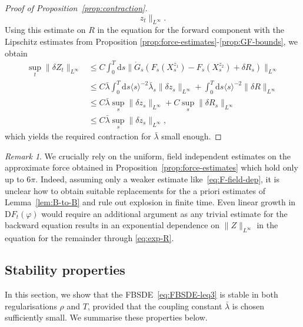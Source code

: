 \documentclass[11pt, a4paper]{scrartcl}
\numberwithin{equation}{section}
\theoremstyle{plain}
\theoremstyle{remark}
\newtheorem{remark}[foo]{Remark}
\newcommand{\mathD}{\mathrm{D}}
\newcommand{\mathd}{\mathrm{d}}
\begin{document}
\begin{proof}[Proof of Proposition~\ref{prop:contraction}]
\[     z_t \|_{L^{\infty}} . \]
  Using this estimate on $R$ in the equation for the forward component with
  the Lipschitz estimates from Proposition
  \ref{prop:force-estimates}-\ref{prop:GF-bounds}, we obtain
  \[ \begin{aligned}
       \sup_t \| \delta Z_t \|_{L^{\infty}} &\leqslant  C \int_0^T \mathd s
       \| \dot{G}_s (F_s (X^{z_1}_s) - F_s (X^{z_2}_s) + \delta R_s)
       \|_{L^{\infty}}\\
       &\leqslant  C \bar{\lambda} \int_0^T \mathd s \langle s \rangle^{- 2}
       \bar{\lambda}_s \| \delta z_s \|_{L^{\infty}} + \int_0^T \mathd s \langle s
       \rangle^{- 2} \| \delta R \|_{L^{\infty}}\\
       &\leqslant  C \bar{\lambda} \sup_s \| \delta z_s \|_{L^{\infty}} + C
       \sup_s \| \delta R_s \|_{L^{\infty}}\\
       &\leqslant  C \bar{\lambda} \sup_s \| \delta z_s \|_{L^{\infty}},
     \end{aligned} \]
  which yields the required contraction for $\bar{\lambda}$ small enough.
\end{proof}

\begin{remark}
  \label{rem:FBSDE-6p}We crucially rely on the uniform, field independent
  estimates on the approximate force obtained in
  Proposition~\ref{prop:force-estimates} which hold only up to $6 \pi$.
  Indeed, assuming only a weaker estimate like~\eqref{eq:F-field-dep}, it is
  unclear how to obtain suitable replacements for the a priori estimates of
  Lemma~\ref{lem:B-to-B} and rule out explosion in finite time. Even linear
  growth in $\mathD F_t (\varphi)$ would require an additional argument as any
  trivial estimate for the backward equation results in an exponential
  dependence on $\| Z \|_{L^{\infty}}$ in the equation for the remainder
  through \eqref{eq:exp-R}.
\end{remark}

\subsection{Stability properties}

In this section, we show that the FBSDE~\eqref{eq:FBSDE-leq3} is stable in both regularisations $\rho$ and $T$,
provided that the coupling constant $\bar{\lambda}$ is chosen sufficiently small. We
summarise these properties below.
\end{document}
